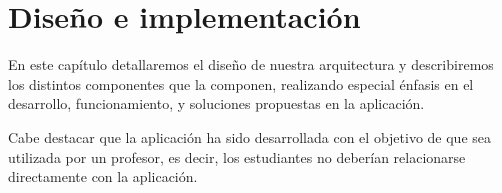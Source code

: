 \documentclass[a4paper, 12pt]{book}
\begin{document}

\cleardoublepage
\chapter{Diseño e implementación}

En este capítulo detallaremos el diseño de nuestra arquitectura y
describiremos los distintos componentes que la componen, realizando
especial énfasis en el desarrollo, funcionamiento, y soluciones
propuestas en la aplicación.

Cabe destacar que la aplicación ha sido desarrollada con el objetivo de que
sea utilizada por un profesor, es decir, los estudiantes no deberían
relacionarse directamente con la aplicación.
\end{document}
